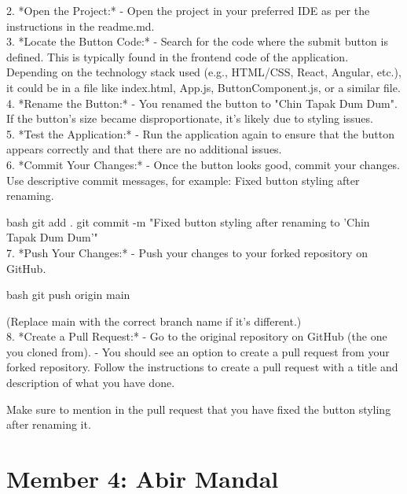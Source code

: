 \documentclass[a4paper,12pt]{article}
\begin{document}
2. *Open the Project:*
   - Open the project in your preferred IDE as per the instructions in the readme.md.\\

3. *Locate the Button Code:*
   - Search for the code where the submit button is defined. This is typically found in the frontend code of the application. Depending on the technology stack used (e.g., HTML/CSS, React, Angular, etc.), it could be in a file like index.html, App.js, ButtonComponent.js, or a similar file.\\

4. *Rename the Button:*
   - You renamed the button to "Chin Tapak Dum Dum". If the button’s size became disproportionate, it’s likely due to styling issues.\\

5. *Test the Application:*
   - Run the application again to ensure that the button appears correctly and that there are no additional issues.\\

6. *Commit Your Changes:*
   - Once the button looks good, commit your changes. Use descriptive commit messages, for example: Fixed button styling after renaming.

   bash
   git add .
   git commit -m "Fixed button styling after renaming to 'Chin Tapak Dum Dum'"
   \\
   
7. *Push Your Changes:*
   - Push your changes to your forked repository on GitHub.

   bash
   git push origin main
   

   (Replace main with the correct branch name if it's different.)\\
   
8. *Create a Pull Request:*
   - Go to the original repository on GitHub (the one you cloned from).
   - You should see an option to create a pull request from your forked repository. Follow the instructions to create a pull request with a title and description of what you have done.

   Make sure to mention in the pull request that you have fixed the button styling after renaming it.


\newpage

\section*{Member 4: Abir Mandal}
\date{\today}
\end{document}
